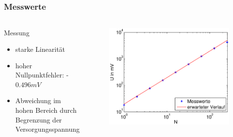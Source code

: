 \begin{frame}
    \frametitle{Messwerte}
    \framesubtitle{}
    \begin{columns}[c]
            \begin{block}{Messung}
                \begin{itemize}
                    \item starke Linearität
                    \item hoher Nullpunktfehler: -$0.496mV$
                    \item Abweichung im hohen Bereich durch Begrenzung der
                    Versorgungsspannung
                \end{itemize}
            \end{block}
            \begin{figure}[H]
            \begin{center}
                    \includegraphics[scale=0.3]{./img/graph/Aufgabe1b.eps}
            \end{center}
            \end{figure}
    \end{columns}
\end{frame}
